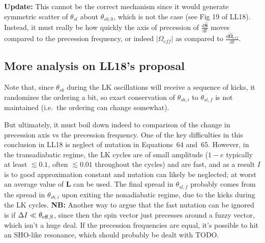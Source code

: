 \documentclass[11pt,
        usenames, %
        dvipsnames %
    ]{article}
\newcommand*{\rd}[2]{\frac{\mathrm{d}#1}{\mathrm{d}#2}}
\newcommand*{\bm}[1]{\boldsymbol{\mathbf{#1}}}
\newcommand*{\abs}[1]{\left|#1\right|}
\begin{document}
\textbf{Update:} This cannot be the correct mechanism since it would generate
symmetric scatter of $\theta_{sl}$ about $\theta_{sb, 0}$, which is not the case
(see Fig 19 of LL18). Instead, it must really be how quickly the axis of
precession of $\rd{\hat{\bm{S}}}{t}$ moves compared to the precession
frequency, or indeed $\abs{\Omega_{eff}}$ as compared to
$\rd{\hat{\bm{\Omega}}_{eff}}{t}$.

\subsection{More analysis on LL18's proposal}

Note that, since $\theta_{sb}$ during the LK oscillations will receive a
sequence of kicks, it randomizes the ordering a bit, so exact conservation of
$\theta_{sb, i}$ to $\theta_{sl, f}$ is not maintained (i.e.\ the ordering can
change somewhat).

But ultimately, it must boil down indeed to comparison of the change in
precession axis vs the precession frequency. One of the key difficulties in this
conclusion in LL18 is neglect of nutation in Equations~64 and~65. However, in
the transadiabatic regime, the LK cycles are of small amplitude ($1 - e$
typically at least $\lesssim 0.1$, often $\lesssim 0.01$ throughout the cycles)
and are fast, and as a result $I$ is to good approximation constant and nutation
can likely be neglected; at worst an average value of $\bm{L}$ can be used. The
final spread in $\theta_{sl, f}$ probably comes from the spread in $\theta_{sb,
i}$ upon exiting the nonadiabatic regime, due to the kicks during the LK cycles.
\textbf{NB:} Another way to argue that the fast nutation can be ignored is if
$\Delta I \ll \theta_{\rm eff, S}$, since then the spin vector just precesses
around a fuzzy vector, which isn't a huge deal. If the precession frequencies
are equal, it's possible to hit an SHO-like resonance, which should probably be
dealt with TODO\@.
\end{document}
